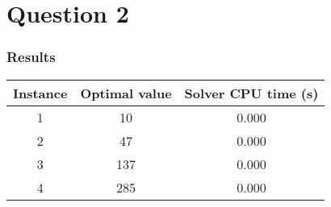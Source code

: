 \section{Question 2}

\subsubsection*{Results}

\begin{table}[h!]
	\centering
	\begin{tabular}{|c|c|c|}
		\hline
		\textbf{Instance} & \textbf{Optimal value} & \textbf{Solver CPU time (s)} \\
		\hline
		1 & 10  & 0.000 \\
		\hline
		2 & 47 & 0.000 \\
		\hline
		3 & 137 & 0.000 \\
		\hline
		4 & 285 & 0.000 \\
		\hline
	\end{tabular}
	\label{tab:instance_costs}
\end{table}
